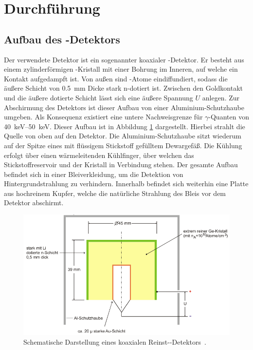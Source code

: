 \newpage
\section{Durchführung}
\label{sec:Durchführung}

\subsection{Aufbau des -Detektors}
\label{sec:AufbauDetektor}

Der verwendete Detektor ist ein sogenannter koaxialer -Detektor.
Er besteht aus einem zylinderförmigen -Kristall mit einer Bohrung im
Inneren, auf welche ein Kontakt aufgedampft ist. Von außen sind -Atome
eindiffundiert, sodass die äußere Schicht von \SI{0.5}{\milli\meter} Dicke
stark n-dotiert ist.
Zwischen den Goldkontakt und die äußere dotierte Schicht lässt sich eine äußere
Spannung $U$ anlegen.
Zur Abschirmung des Detektors ist dieser Aufbau von einer Aluminium-Schutzhaube
umgeben. Als Konsequenz existiert eine untere Nachweisgrenze für $\gamma$-Quanten
von \SIrange{40}{50}{\kilo\electronvolt}.
Dieser Aufbau ist in Abbildung \ref{fig:Versuchsaufbau} dargestellt.
Hierbei strahlt die Quelle von oben auf den Detektor.
Die Aluminium-Schutzhaube sitzt wiederum auf der Spitze eines mit flüssigem
Stickstoff gefülltem Dewargefäß. Die Kühlung erfolgt über einen wärmeleitenden
Kühlfinger, über welchen das Stickstoffreservoir und der Kristall in Verbindung stehen.
Der gesamte Aufbau befindet sich in einer Bleiverkleidung, um die Detektion
von Hintergrundstrahlung zu verhindern. Innerhalb befindet sich weiterhin eine
Platte aus hochreinem Kupfer, welche die natürliche Strahlung des Bleis vor dem
Detektor abschirmt.
\begin{figure}
	\centering
	\includegraphics[width=.8\textwidth]{images/Versuchsaufbau.pdf}
	\caption{Schematische Darstellung eines koaxialen Reinst--Detektors~\cite[14]{anleitung}.}
	\label{fig:Versuchsaufbau}
\end{figure}

